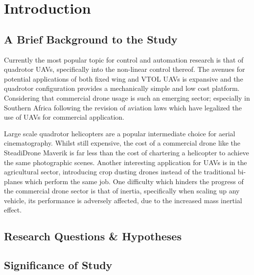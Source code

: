 \chapter{Introduction}
\label{ch:ch1}
\section{A Brief Background to the Study}
\label{sec:ch1.study}
Currently the most popular topic for control and automation research is that of quadrotor UAVs, specifically into the non-linear control thereof. The avenues for potential applications of both fixed wing and VTOL UAVs is expansive and the quadrotor configuration provides a mechanically simple and low cost platform. Considering that commercial drone usage is such an emerging sector; especially in Southern Africa following the revision of aviation laws which have legalized the use of UAVs for commercial application. 
\par
Large scale quadrotor helicopters are a popular intermediate choice for aerial cinematography.  Whilst still expensive, the cost of a commercial drone like the SteadiDrone Maverik \cite{steadidrone} is far less than the cost of chartering a helicopter to achieve the same photographic scenes. Another interesting application for UAVs is in the agricultural sector, introducing crop dusting drones instead of the traditional bi-planes which perform the same job. One difficulty which hinders the progress of the commercial drone sector is that of inertia, specifically when scaling up any vehicle, its performance is adversely affected, due to the increased mass inertial effect.
\section{Research Questions \& Hypotheses}
\label{sec:ch1.hypotheses}

\section{Significance of Study}
\label{sec:ch1.significance}

